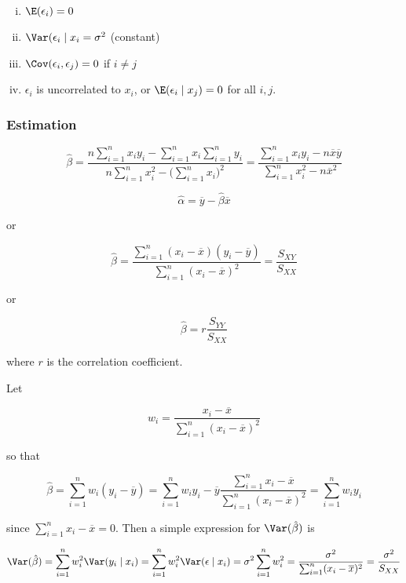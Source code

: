 \begin{enumerate}[(i)]

\item \(\E(\epsilon_i)= 0\)

\item \(\Var(\epsilon_i \mid x_i = \sigma^2\) (constant)

\item \(\Cov(\epsilon_i, \epsilon_j) = 0 \) if \(i \neq j\)

\item \(\epsilon_i\) is uncorrelated to \(x_i\), or \(\E(\epsilon_i \mid x_j) = 0 \) for all \(i, j\).

\end{enumerate}

\subsubsection{Estimation}

\[
\hat{\beta} = \frac{n\sum_{i=1}^n x_i y_i - \sum_{i=1}^n x_i \sum_{i=1}^n y_i}{n \sum_{i=1}^n x_i^2 - \big( \sum_{i=1}^n x_i \big)^2} = \frac{\sum_{i=1}^n x_i y_i - n \overline{x} \overline{y}}{\sum_{i=1}^n x_i^2 - n \overline{x}^2}
\]

\[
\hat{\alpha} = \overline{y} - \hat{\beta} \overline{x}
\]

or

\[
\hat{\beta} = \frac{\sum_{i=1}^n (x_i - \overline{x})(y_i - \overline{y})}{\sum_{i=1}^n(x_i - \overline{x})^2} = \frac{S_{XY}}{S_{XX}}
\]

or

\[
\hat{\beta} = r \frac{S_{YY}}{S_{XX}}
\]

where \(r\) is the correlation coefficient.

Let

\[
w_i = \frac{x_i - \overline{x}}{\sum_{i=1}^n (x_i - \overline{x})^2}
\]

so that 

\[
\hat{\beta} = \sum_{i=1}^n w_i( y_i - \overline{y}) = \sum_{i=1}^n w_i y_i  - \overline{y} \frac{  \sum_{i=1}^n x_i - \overline{x}}{\sum_{i=1}^n (x_i - \overline{x})^2} =  \sum_{i=1}^n w_i y_i 
\]

since \(  \sum_{i=1}^n x_i - \overline{x} = 0\). Then a simple expression for \(\Var(\hat{\beta})\) is 

\[
\Var(\hat{\beta}) = \sum_{i=1}^n w_i^2 \Var(y_i \mid x_i) = \sum_{i=1}^n w_i^2 \Var(\epsilon \mid x_i) = \sigma^2 \sum_{i=1}^n w_i^2 = \frac{\sigma^2}{\sum_{i=1}^n (x_i - \overline{x})^2} = \frac{\sigma^2}{S_{XX}}
\]

